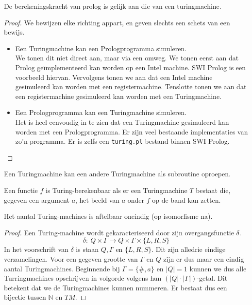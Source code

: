 \documentclass[main.tex]{subfiles}
\begin{document}
\begin{st}
  De berekeningskracht van prolog is gelijk aan die van een turingmachine.

  \begin{proof}
    We bewijzen elke richting appart, en geven slechts een schets van een bewijs.
    \begin{itemize}
    \item Een Turingmachine kan een Prologprogramma simuleren.\\
      We tonen dit niet direct aan, maar via een omweg.
      We tonen eerst aan dat Prolog ge\"implementeerd kan worden op een Intel machine.
      SWI Prolog is een voorbeeld hiervan.
      Vervolgens tonen we aan dat een Intel machine gesimuleerd kan worden met een registermachine.
      Tenslotte tonen we aan dat een registermachine gesimuleerd kan worden met een Turingmachine.
    \item Een Prologprogramma kan een Turingmachine simuleren.\\
      Het is heel eenvoudig in te zien dat een Turingmachine gesimuleerd kan worden met een Prologprogramma.
      Er zijn veel bestaande implementaties van zo'n programma.
      Er is zelfs een \verb|turing.pl| bestand binnen SWI Prolog.\cite{prolog-tm}
    \end{itemize}
  \end{proof}
\end{st}

\begin{de}
  Een Turingmachine kan een andere Turingmachine als subroutine oproepen.
\end{de}

\begin{de}
  Een functie $f$ is Turing-berekenbaar als er een Turingmachine $T$ bestaat die, gegeven een argument $a$, het beeld van $a$ onder $f$ op de band kan zetten.
\end{de}

\begin{st}
  Het aantal Turing-machines is aftelbaar oneindig (op isomorfisme na).

  \begin{proof}
    Een Turing-machine wordt gekaracteriseerd door zijn overgangsfunctie $\delta$.
    \[ \delta:\ Q \times \Gamma \rightarrow Q \times \Gamma \times \{L,R,S\} \]
    In het voorschrift van $\delta$ is staan $Q,\Gamma$ en $\{L,R,S\}$. 
    Dit zijn alledrie eindige verzamelingen. 
    Voor een gegeven grootte van $\Gamma$ en $Q$ zijn er dus maar een eindig aantal Turingmachines.
    Beginnende bij $\Gamma = \{\#,a\}$ en $|Q|=1$ kunnen we dus alle Turringmachines opschrijven in volgorde volgens hun $(|Q|\cdot|\Gamma|)$-getal.
    Dit betekent dat we de Turingmachines kunnen nummeren.
    Er bestaat dus een bijectie tussen $\mathbb{N}$ en $TM$.
  \end{proof}
\end{st}
\end{document}
